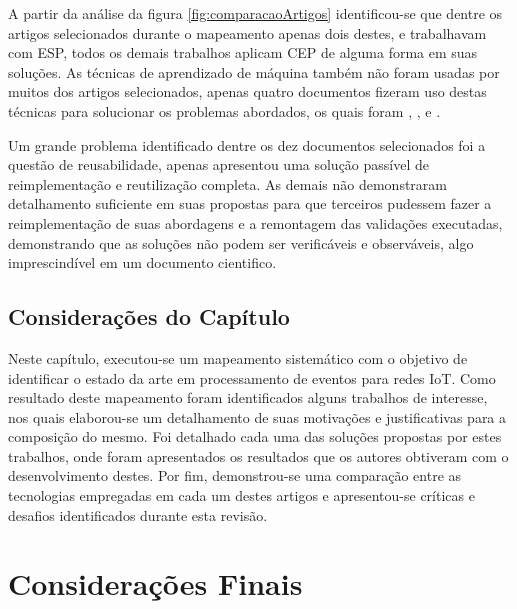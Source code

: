 \documentclass[ti,table]{texufpel} %
\begin{document}
  

  

A partir da análise da figura \ref{fig:comparacaoArtigos} identificou-se que dentre os artigos selecionados durante o mapeamento apenas dois destes, \cite{art1aslam2018towards} e \cite{art5chen2016dress} trabalhavam com ESP, todos os demais trabalhos aplicam CEP de alguma forma em suas soluções. As técnicas de aprendizado de máquina também não foram usadas por muitos dos artigos selecionados, apenas quatro documentos fizeram uso destas técnicas para solucionar os problemas abordados, os quais foram \cite{art1aslam2018towards}, \cite{art4akbar2017predictive}, \cite{art9kousiouris2018integrated} e \cite{art10soto2016ceml}.  

  

Um grande problema identificado dentre os dez documentos selecionados foi a questão de reusabilidade, apenas \cite{art2zimmerle2018web} apresentou uma solução passível de reimplementação e reutilização completa. As demais não demonstraram detalhamento suficiente em suas propostas para que terceiros pudessem  fazer a reimplementação de suas abordagens e a remontagem das validações executadas, demonstrando que as soluções não podem ser verificáveis e observáveis, algo imprescindível em um documento cientifico.  

  

\section{Considerações do Capítulo} 

  

Neste capítulo, executou-se um mapeamento sistemático com o objetivo de identificar o estado da arte em processamento de eventos para redes IoT. Como resultado deste mapeamento foram identificados alguns trabalhos de interesse, nos quais elaborou-se um detalhamento de suas motivações e justificativas para a composição do mesmo. Foi detalhado cada uma das soluções propostas por estes trabalhos, onde foram apresentados os resultados que os autores obtiveram com o desenvolvimento destes. Por fim, demonstrou-se uma comparação entre as tecnologias empregadas em cada um destes artigos e apresentou-se críticas e desafios identificados durante esta revisão.  

  


  

\chapter{Considerações Finais} 
\end{document}
